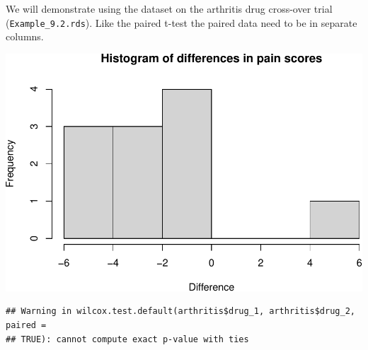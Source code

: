 \documentclass[
]{memoir}
\newenvironment{Shaded}{\begin{snugshade}}{\end{snugshade}}
\newcommand{\AttributeTok}[1]{\textcolor[rgb]{0.77,0.63,0.00}{#1}}
\newcommand{\ConstantTok}[1]{\textcolor[rgb]{0.00,0.00,0.00}{#1}}
\newcommand{\FunctionTok}[1]{\textcolor[rgb]{0.00,0.00,0.00}{#1}}
\newcommand{\NormalTok}[1]{#1}
\newcommand{\OtherTok}[1]{\textcolor[rgb]{0.56,0.35,0.01}{#1}}
\newcommand{\SpecialCharTok}[1]{\textcolor[rgb]{0.00,0.00,0.00}{#1}}
\newcommand{\StringTok}[1]{\textcolor[rgb]{0.31,0.60,0.02}{#1}}
\begin{document}
We will demonstrate using the dataset on the arthritis drug cross-over trial (\texttt{Example\_9.2.rds}). Like the paired t-test the paired data need to be in separate columns.

\begin{Shaded}
\end{Shaded}

\includegraphics{phcm9795-R-notes_files/figure-latex/unnamed-chunk-131-1.pdf}

\begin{Shaded}
\end{Shaded}

\begin{verbatim}
## Warning in wilcox.test.default(arthritis$drug_1, arthritis$drug_2, paired =
## TRUE): cannot compute exact p-value with ties
\end{verbatim}
\end{document}
